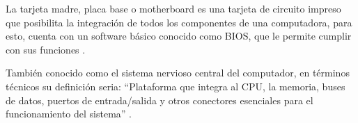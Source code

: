 La tarjeta madre, placa base o motherboard es una tarjeta de circuito impreso que posibilita la integración de todos los componentes de una computadora, para esto, cuenta con un software básico conocido como BIOS, que le permite cumplir con sus funciones \cite{conceptoplacamadre}.

También conocido como el sistema nervioso central del computador, en términos técnicos su definición seria: “Plataforma que integra al CPU, la memoria, buses de datos, puertos de entrada/salida y otros conectores esenciales para el funcionamiento del sistema” \cite{definicionplacamandre}.
